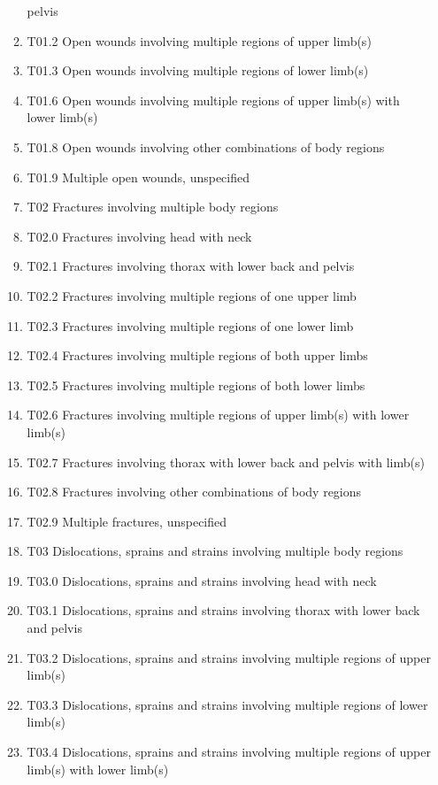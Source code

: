 \documentclass[
]{scrartcl}
\begin{document}
\begin{itemize}
\begin{enumerate}
    pelvis
  \item
    T01.2 Open wounds involving multiple regions of upper limb(s)
  \item
    T01.3 Open wounds involving multiple regions of lower limb(s)
  \item
    T01.6 Open wounds involving multiple regions of upper limb(s) with
    lower limb(s)
  \item
    T01.8 Open wounds involving other combinations of body regions
  \item
    T01.9 Multiple open wounds, unspecified
  \item
    T02 Fractures involving multiple body regions
  \item
    T02.0 Fractures involving head with neck
  \item
    T02.1 Fractures involving thorax with lower back and pelvis
  \item
    T02.2 Fractures involving multiple regions of one upper limb
  \item
    T02.3 Fractures involving multiple regions of one lower limb
  \item
    T02.4 Fractures involving multiple regions of both upper limbs
  \item
    T02.5 Fractures involving multiple regions of both lower limbs
  \item
    T02.6 Fractures involving multiple regions of upper limb(s) with
    lower limb(s)
  \item
    T02.7 Fractures involving thorax with lower back and pelvis with
    limb(s)
  \item
    T02.8 Fractures involving other combinations of body regions
  \item
    T02.9 Multiple fractures, unspecified
  \item
    T03 Dislocations, sprains and strains involving multiple body
    regions
  \item
    T03.0 Dislocations, sprains and strains involving head with neck
  \item
    T03.1 Dislocations, sprains and strains involving thorax with lower
    back and pelvis
  \item
    T03.2 Dislocations, sprains and strains involving multiple regions
    of upper limb(s)
  \item
    T03.3 Dislocations, sprains and strains involving multiple regions
    of lower limb(s)
  \item
    T03.4 Dislocations, sprains and strains involving multiple regions
    of upper limb(s) with lower limb(s)

\end{enumerate}
\end{itemize}
\end{document}
